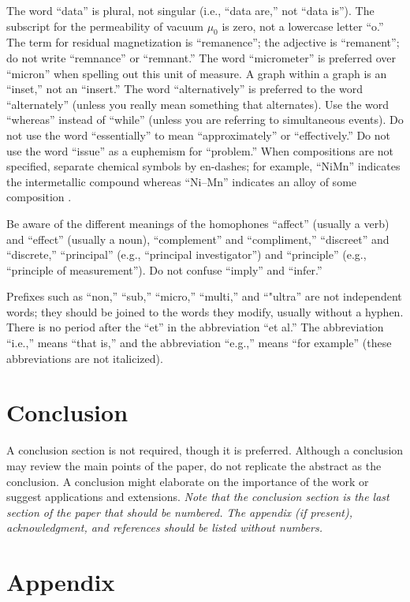 \documentclass[conf]{new-aiaa}
\begin{document}
The word ``data'' is plural, not singular (i.e., ``data are,'' not ``data is''). The subscript for the permeability of vacuum $\mu_0$ is zero, not a lowercase letter ``o.'' The term for residual magnetization is ``remanence''; the adjective is ``remanent''; do not write ``remnance'' or ``remnant.'' The word ``micrometer'' is preferred over ``micron'' when spelling out this unit of measure. A graph within a graph is an ``inset,'' not an ``insert.'' The word ``alternatively'' is preferred to the word ``alternately'' (unless you really mean something that alternates). Use the word ``whereas'' instead of ``while'' (unless you are referring to simultaneous events). Do not use the word ``essentially'' to mean ``approximately'' or ``effectively.'' Do not use the word ``issue'' as a euphemism for ``problem.'' When compositions are not specified, separate chemical symbols by en-dashes; for example, ``NiMn'' indicates the intermetallic compound  whereas ``Ni--Mn'' indicates an alloy of some composition .

Be aware of the different meanings of the homophones ``affect'' (usually a verb) and ``effect'' (usually a noun), ``complement'' and ``compliment,'' ``discreet'' and ``discrete,'' ``principal'' (e.g., ``principal investigator'') and ``principle'' (e.g., ``principle of measurement''). Do not confuse ``imply'' and ``infer.''

Prefixes such as ``non,'' ``sub,'' ``micro,'' ``multi,'' and ``"ultra'' are not independent words; they should be joined to the words they modify, usually without a hyphen. There is no period after the ``et'' in the abbreviation ``et al.'' The abbreviation ``i.e.,'' means ``that is,'' and the abbreviation ``e.g.,'' means ``for example'' (these abbreviations are not italicized).


\section{Conclusion}
A conclusion section is not required, though it is preferred. Although a conclusion may review the main points of the paper, do not replicate the abstract as the conclusion. A conclusion might elaborate on the importance of the work or suggest applications and extensions. \textit{Note that the conclusion section is the last section of the paper that should be numbered. The appendix (if present), acknowledgment, and references should be listed without numbers.}


\section*{Appendix}
\end{document}
